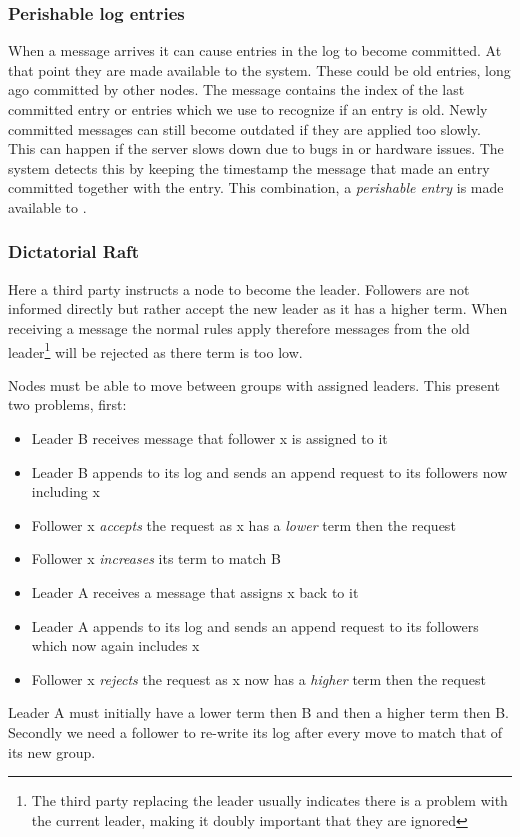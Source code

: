 \subsubsection*{Perishable log entries}
When a \raft{} message arrives it can cause entries in the log to become committed. At that point they are made available to the system. These could be old entries, long ago committed by other nodes. The message contains the index of the last committed entry or entries which we use to recognize if an entry is old. Newly committed messages can still become outdated if they are applied too slowly. This can happen if the server slows down due to bugs in \name{} or hardware issues. The system detects this by keeping the timestamp the message that made an entry committed together with the entry. This combination, a \textit{perishable entry} is made available to \name{}.

\subsubsection*{Dictatorial Raft}
Here a third party instructs a node to become the leader. Followers are not informed directly but rather accept the new leader as it has a higher term. When receiving a message the normal \raft{} rules apply therefore messages from the old leader\footnote{The third party replacing the leader usually indicates there is a problem with the current leader, making it doubly important that they are ignored} will be rejected as there term is too low.

Nodes must be able to move between groups with assigned leaders. This present two problems, first:
\begin{itemize}
	\item Leader B receives message that follower x is assigned to it
	\item Leader B appends to its log and sends an append request to its followers now including x
	\item Follower x \emph{accepts} the request as x has a \emph{lower} term then the request
	\item Follower x \emph{increases} its term to match B
	\item Leader A receives a message that assigns x back to it
	\item Leader A appends to its log and sends an append request to its followers which now again includes x
	\item Follower x \emph{rejects} the request as x now has a \emph{higher} term then the request
\end{itemize}
Leader A must initially have a lower term then B and then a higher term then B. Secondly we need a follower to re-write its log after every move to match that of its new group. 

